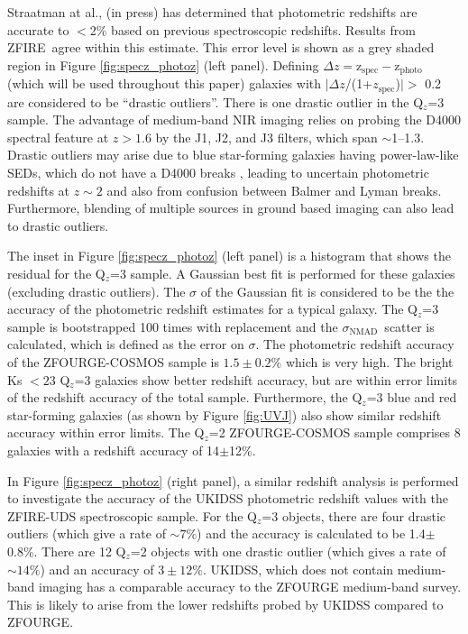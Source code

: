 \documentclass[iop]{emulateapj}
\newcommand{\around}{$\sim$}
\newcommand{\NMAD}{$\sigma_{\mathrm{NMAD}}$}
\newcommand{\zspec}{$z_{\mathrm{spec}}$}
\begin{document}
Straatman at al., (in press) has determined that photometric redshifts are accurate to $<$2\% based on previous spectroscopic redshifts.  
Results from ZFIRE\ agree within this estimate. 
This error level is shown as a grey shaded region in Figure \ref{fig:specz_photoz} (left panel). Defining $\Delta z=\mathrm{z_{spec}-z_{photo}}$ (which will be used throughout this paper)
galaxies with $|\Delta z$/(1+\zspec)$|>$ 0.2 are considered to be ``drastic outliers''. There is one  drastic outlier in the Q$_{z}$=3 sample.
The advantage of medium-band NIR imaging relies on probing the D4000 spectral feature at $z>1.6$ by the J1, J2, and J3 filters, which span  \around 1--1.3\micron. 
Drastic outliers may arise due to blue star-forming galaxies having power-law-like SEDs, which do not have a D4000 breaks \citep{Bergh1963}, leading to uncertain photometric redshifts at $z\sim2$ and also from confusion between Balmer and Lyman breaks. Furthermore, blending of multiple sources in ground based imaging can also lead to drastic outliers. 


The inset in Figure \ref{fig:specz_photoz} (left panel) is a histogram that shows the residual for the Q$_{z}$=3 sample. 
A Gaussian best fit is performed for these galaxies (excluding  drastic outliers). The $\sigma$ of the Gaussian fit is considered to be the the accuracy of the photometric redshift estimates for a typical galaxy. The Q$_{z}$=3 sample is bootstrapped 100 times with replacement and the \NMAD\ scatter is calculated, which is defined as the error on  $\sigma$. 
The photometric redshift accuracy of the ZFOURGE-COSMOS sample is $1.5\pm0.2\%$ which is very high. 
The bright Ks $<23$ Q$_{z}$=3 galaxies show better redshift accuracy, but are within error limits of the redshift accuracy of the total sample. 
Furthermore, the Q$_{z}$=3 blue and red star-forming galaxies (as shown by Figure \ref{fig:UVJ}) also show similar redshift accuracy within error limits. 
The Q$_{z}$=2 ZFOURGE-COSMOS sample comprises 8 galaxies with a redshift accuracy of 14$\pm$12\%. 


In Figure \ref{fig:specz_photoz} (right panel), a similar redshift analysis is performed to investigate the accuracy of the UKIDSS photometric redshift values with the ZFIRE-UDS spectroscopic sample. For the Q$_{z}$=3 objects, there are four drastic outliers (which give a rate of $\sim7\%$) and the accuracy is calculated to be 1.4$\pm$0.8\%. There are 12 Q$_{z}$=2 objects with one drastic outlier (which gives a rate of $\sim14\%$) and an accuracy of $3\pm12\%$. 
UKIDSS, which does not contain medium-band imaging has a comparable accuracy to the ZFOURGE medium-band survey. This is likely to arise from the lower redshifts probed by UKIDSS compared to ZFOURGE.
\end{document}
